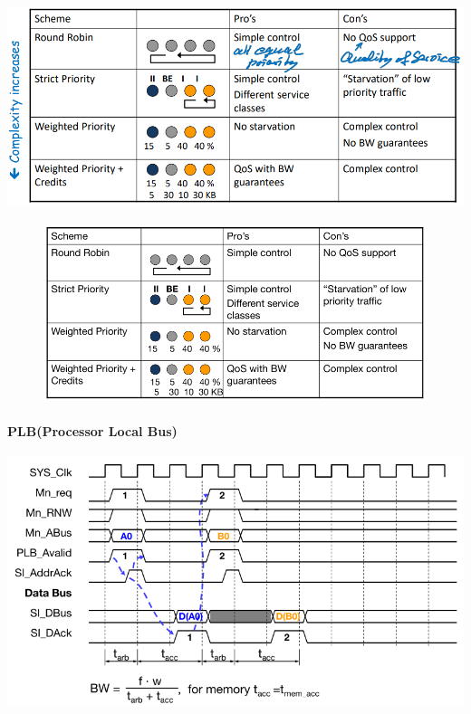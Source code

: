 \documentclass[english]{latex4ei/latex4ei_sheet}
\begin{document}
\begin{center}
  \centering
  \includegraphics[width=\linewidth]{assets/BusArbitration.png}
  \label{fig:busarbitration}
\end{center}

\begin{figure}
	\centering
	\includegraphics[width=\linewidth]{images//6.Interconnects/BusArbitrationSchemes.png}
\end{figure}

\paragraph{PLB(Processor Local Bus)}

\begin{center}
	\includegraphics[width=\linewidth]{images//6.Interconnects/PLBTiming.png}
\end{center}
\end{document}
